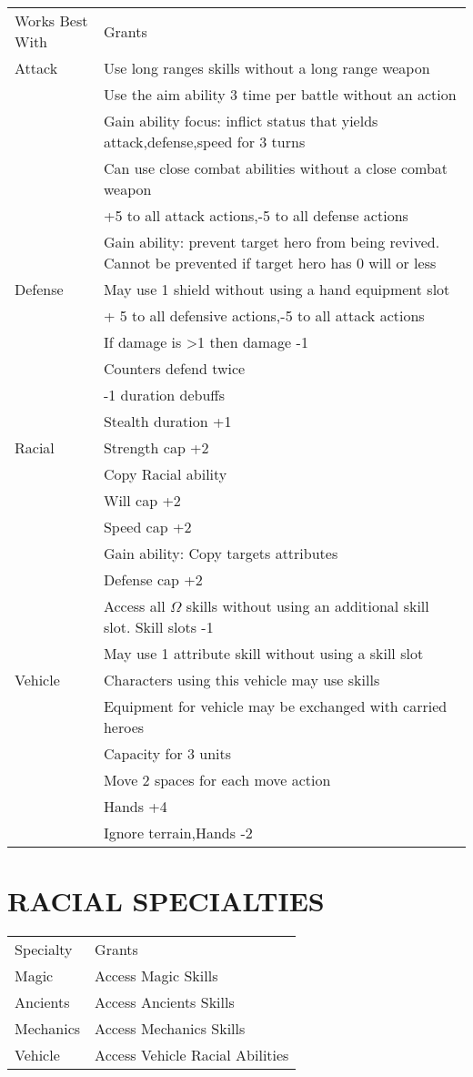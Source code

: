 \newpage
\begin{tabularx}{\textwidth}{l X}
\hline
Works Best With & Grants \\
Attack & Use long ranges skills without a long range weapon \\
  & Use the aim ability 3 time per battle without an action \\
  & Gain ability focus: inflict status that yields attack,defense,speed for 3 turns\\
  & Can use close combat abilities without a close combat weapon\\
  & +5 to all attack actions,-5 to all defense actions\\
  & Gain ability: prevent target hero from being revived.  Cannot be prevented if target hero has 0 will or less \\
Defense & May use 1 shield without using a hand equipment slot\\
  & + 5 to all defensive actions,-5 to all attack actions\\
  & If damage is >1 then damage -1 \\
  & Counters defend twice\\
  & -1 duration debuffs \\
  & Stealth duration +1\\
Racial &  Strength cap +2 \\
  &  Copy Racial ability \\
  & Will cap +2 \\
  & Speed cap +2 \\
  & Gain ability: Copy targets attributes\\
  & Defense cap +2\\
  & Access all $\Omega$ skills without using an additional skill slot.  Skill slots -1 \\
  & May use 1 attribute skill without using a skill slot\\
Vehicle & Characters using this vehicle may use skills\\
  & Equipment for vehicle may be exchanged with carried heroes\\
  & Capacity for 3 units \\
  & Move 2 spaces for each move action\\
  & Hands +4 \\
  & Ignore terrain,Hands -2\\
\end{tabularx}
\section{RACIAL SPECIALTIES}
\begin{tabularx}{\textwidth}{l X}
Specialty & Grants \\
Magic & Access Magic Skills\\
Ancients& Access Ancients Skills\\
Mechanics& Access Mechanics Skills\\
Vehicle& Access Vehicle Racial Abilities\\
\end{tabularx}

